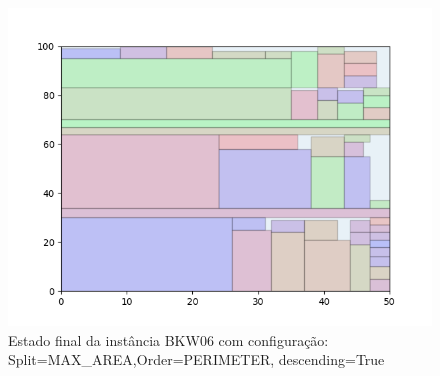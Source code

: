 \begin{figure}[H]
    \centering
    \caption[]{Estado final da instância BKW06 com configuração: Split=MAX_AREA,Order=PERIMETER, descending=True}
    \label{fig:bkw06-max_area-perimeter-true}
    \includegraphics[scale=0.5]{output/figures/bkw/bkw06/max_area/perimeter/true/00}
\end{figure}
